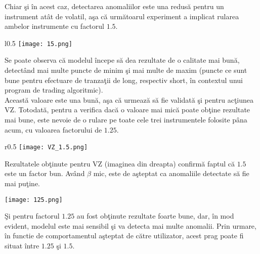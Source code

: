 \newpage 

\noindent Chiar \c si \^ in acest caz, detectarea anomaliilor este una redus\u a pentru un instrument at\^ at de volatil, a\c sa c\u a urm\u atoarul experiment a implicat rularea ambelor instrumente cu factorul $1.5$. 

\begin{wrapfigure}[16]{l}{0.5\textwidth}
    \texttt{[image: 15.png]}
\end{wrapfigure}

\hfill \break

\noindent Se poate observa c\u a modelul \^ incepe s\u a dea rezultate de o calitate mai bun\u a, detect\^ and mai multe puncte de minim \c si mai multe de maxim (puncte ce sunt bune pentru efectuare de tranza\c tii de long, respectiv short, \^ in contextul unui program de trading algoritmic). \\
\noindent Aceast\u a valoare este una bun\u a, a\c sa c\u a urmeaz\u a s\u a fie validat\u a \c si pentru ac\c tiunea VZ. Totodat\u a, pentru a verifica dac\u a o valoare mai mic\u a poate ob\c tine rezultate mai bune, este nevoie de o rulare pe toate cele trei instrumentele folosite p\^ ana acum, cu valoarea factorului de $1.25$. 

\begin{wrapfigure}[5]{r}{0.5\textwidth}
    \texttt{[image: VZ\_1.5.png]}
\end{wrapfigure}

\hfill \break 

\noindent Rezultatele ob\c tinute pentru VZ (imaginea din dreapta) confirm\u a faptul c\u a $1.5$ este un factor bun. Av\^ and $\beta$ mic, este de a\c steptat ca anomaliile detectate s\u a fie mai pu\c tine. 

\hfill \break 

\begin{center} \texttt{[image: 125.png]} \end{center}

\noindent \c Si pentru factorul $1.25$ au fost ob\c tinute rezultate foarte bune, dar, \^ in mod evident, modelul este mai sensibil \c si va detecta mai multe anomalii. Prin urmare, \^ in functie de comportamentul a\c steptat de c\u atre utilizator, acest prag poate fi situat \^ intre $1.25$ \c si $1.5$. 